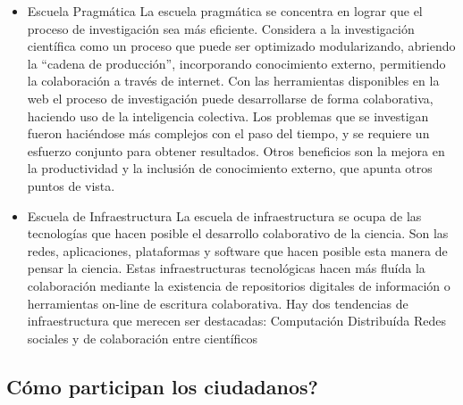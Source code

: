 \begin{itemize}
\begin{itemize}
	\end{itemize}
	\item {Escuela Pragmática}
	La escuela pragmática se concentra en lograr que el proceso de investigación sea más eficiente. Considera a la investigación científica como un proceso que puede ser optimizado modularizando, abriendo la ``cadena de producción'', incorporando conocimiento externo, permitiendo la colaboración a través de internet. Con las herramientas disponibles en la web el proceso de investigación puede desarrollarse de forma colaborativa, haciendo uso de la inteligencia colectiva. Los problemas que se investigan fueron haciéndose más complejos con el paso del tiempo, y se requiere un esfuerzo conjunto para obtener resultados. Otros beneficios son la mejora en la productividad y la inclusión de conocimiento externo, que apunta otros puntos de vista. 
	
	\item {Escuela de Infraestructura} 
		La escuela de infraestructura se ocupa de las tecnologías que hacen posible el desarrollo colaborativo de la ciencia. Son las redes, aplicaciones, plataformas y software que hacen posible esta manera de pensar la ciencia. Estas infraestructuras tecnológicas hacen más fluída la colaboración mediante la existencia de repositorios digitales de información o herramientas on-line de escritura colaborativa. Hay dos tendencias de infraestructura que merecen ser destacadas:
		Computación Distribuída
		Redes sociales y de colaboración entre científicos
		
\end{itemize}	
	
\subsection{Cómo participan los ciudadanos?}

